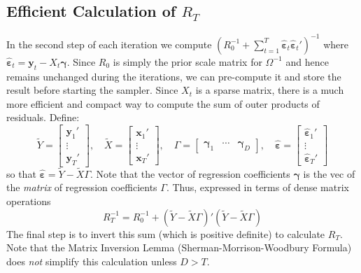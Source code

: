 \documentclass[12pt]{article}
\begin{document}
\subsection{Efficient Calculation of $R_T$}
In the second step of each iteration we compute 
$\left( R_0^{-1} + \sum_{t=1}^{T} \hat{\boldsymbol{\varepsilon}}_t\hat{\boldsymbol{\varepsilon}}_t'\right)^{-1}$ 
where 
$\hat{\boldsymbol{\varepsilon}}_t=\mathbf{y}_t - X_t \boldsymbol{\gamma}$.
Since $R_0$ is simply the prior scale matrix for $\Omega^{-1}$ and hence remains unchanged during the iterations, we can pre-compute it and store the result before starting the sampler.
Since $X_t$ is a sparse matrix, there is a much more efficient and compact way to compute the sum of outer products of residuals.
Define:
\begin{equation*}
  \widetilde{Y} = \left[
  \begin{array}{c}
    \mathbf{y}_1'\\
    \vdots \\
    \mathbf{y}_T'
  \end{array}
\right], \quad \widetilde{X} = \left[
\begin{array}{c}
  \mathbf{x}_{1}' \\
  \vdots \\
  \mathbf{x}_{T}' 
\end{array}
\right], \quad \Gamma = \left[
\begin{array}{ccc}
  \boldsymbol{\gamma}_1 & \cdots & \boldsymbol{\gamma}_D
\end{array}
\right], \quad \hat{\boldsymbol{\varepsilon}} = \left[
\begin{array}{c}
  \hat{\boldsymbol{\varepsilon}}_1' \\
  \vdots \\
  \hat{\boldsymbol{\varepsilon}}_T'
\end{array}
\right]
\end{equation*}
so that $\hat{\boldsymbol{\varepsilon}} = \widetilde{Y} - \widetilde{X} \Gamma$.
Note that the vector of regression coefficients $\boldsymbol{\gamma}$ is the vec of the \emph{matrix} of regression coefficients $\Gamma$. 
Thus, expressed in terms of dense matrix operations
\begin{equation*}
  R_T^{-1} =  R_0^{-1} + \left( \widetilde{Y} - \widetilde{X} \Gamma \right)'\left( \widetilde{Y} - \widetilde{X} \Gamma \right)
\end{equation*}
The final step is to invert this sum (which is positive definite) to calculate $R_T$.
Note that the Matrix Inversion Lemma (Sherman-Morrison-Woodbury Formula) does \emph{not} simplify this calculation unless $D > T$.
\end{document}
